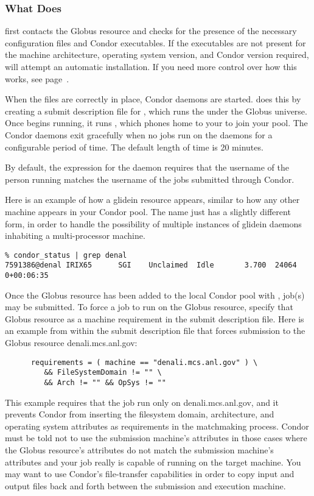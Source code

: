 \subsubsection{What  Does}

 first contacts the Globus resource and checks for the
presence of the necessary configuration files and Condor executables.
If the executables are not present for the machine architecture,
operating system version, and Condor version required,
 will attempt an automatic installation.  If you
need more control over how this works, see page~\pageref{man-condor-glidein}.

When the files are correctly in place,
Condor daemons are started.
 does this by creating a submit description file for
, which runs the  under the Globus
universe.
Once  begins running, it runs , which phones
home to your  to join your pool.
The Condor daemons exit gracefully when no jobs run on the daemons for a
configurable period of time. The default length of time is 20 minutes.

By default, the 
expression for the  daemon requires that the username
of the person running  matches the username of the jobs
submitted through Condor.

Here is an example of how a glidein resource appears, similar to how
any other machine appears in your Condor pool.  The name just has a
slightly different form, in order to handle the possibility of
multiple instances of glidein daemons inhabiting a multi-processor
machine.

\footnotesize
\begin{verbatim}
% condor_status | grep denal
7591386@denal IRIX65      SGI    Unclaimed  Idle       3.700  24064  0+00:06:35
\end{verbatim}
\normalsize

Once the Globus resource has been added to the local Condor
pool with ,
job(s) may be submitted.
To force a job to run on the Globus resource,
specify that Globus resource as a machine requirement
in the submit description file. 
Here is an example from within the submit description file
that forces submission to the Globus resource denali.mcs.anl.gov:
\begin{verbatim}
      requirements = ( machine == "denali.mcs.anl.gov" ) \
         && FileSystemDomain != "" \
         && Arch != "" && OpSys != ""
\end{verbatim}
This example requires that the job run only on denali.mcs.anl.gov,
and it prevents Condor from inserting the filesystem domain,
architecture, and operating system attributes as requirements
in the matchmaking process.
Condor must be told not to use the submission machine's
attributes in those cases
where the Globus resource's attributes
do not match the submission machine's attributes and your job
really is capable of running on the target machine.  You
may want to use Condor's file-transfer capabilities in order
to copy input and output files back and forth between the submission
and execution machine.

